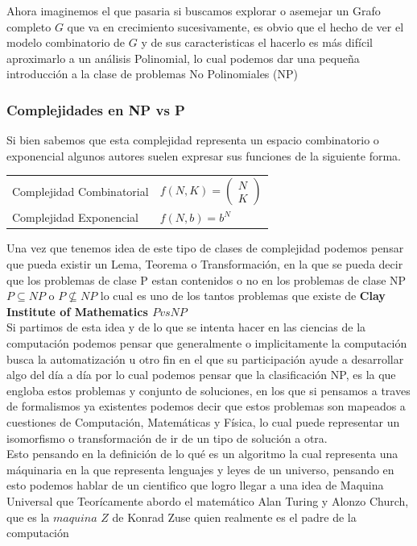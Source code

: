 \documentclass[10pt,executivepaper]{article}
\begin{document}
Ahora imaginemos el que pasaria si buscamos explorar o asemejar un Grafo completo $G$ que va en crecimiento sucesivamente, es obvio que el hecho de ver el modelo combinatorio de $G$ y de sus caracteristicas el hacerlo es más difícil aproximarlo a un análisis Polinomial, lo cual podemos dar una pequeña introducción a la clase de problemas No Polinomiales (NP)
\subsubsection{Complejidades en NP vs P}
Si bien sabemos que esta complejidad representa un espacio combinatorio o exponencial algunos autores suelen expresar sus funciones de la siguiente forma.
\begin{center}
  \begin{tabular}{ p{5cm} p{4cm} }
    Complejidad Combinatorial & $f(N,K)=\begin{pmatrix}N\\K\end{pmatrix}$\\
    Complejidad Exponencial & $f(N,b)=b^N$\\
  \end{tabular}
\end{center}
Una vez que tenemos idea de este tipo de clases de complejidad podemos pensar que pueda existir un Lema, Teorema o Transformación, en la que se pueda decir que los problemas de clase P estan contenidos o no en los problemas de clase NP $P \subseteq NP $ o $P \nsubseteq NP$ lo cual es uno de los tantos problemas que existe de \textbf{Clay Institute of Mathematics $P vs NP$}\\
Si partimos de esta idea y de lo que se intenta hacer en las ciencias de la computación podemos pensar que generalmente o implicitamente la computación busca la automatización u otro fin en el que su participación ayude a desarrollar algo del día a día por lo cual podemos pensar que la clasificación NP, es la que engloba estos problemas y conjunto de soluciones, en los que si pensamos a traves de formalismos ya existentes podemos decir que estos problemas son mapeados a cuestiones de Computación, Matemáticas y Física, lo cual puede representar un isomorfismo o transformación de ir de un tipo de solución a otra.\\
Esto pensando en la definición de lo qué es un algoritmo la cual representa una máquinaria en la que representa lenguajes y leyes de un universo, pensando en esto podemos hablar de un cientifico que logro llegar a una idea de Maquina Universal que Teorícamente abordo el matemático Alan Turing y Alonzo Church, que es la $maquina$ $Z$ de Konrad Zuse quien realmente es el padre de la computación
\end{document}
